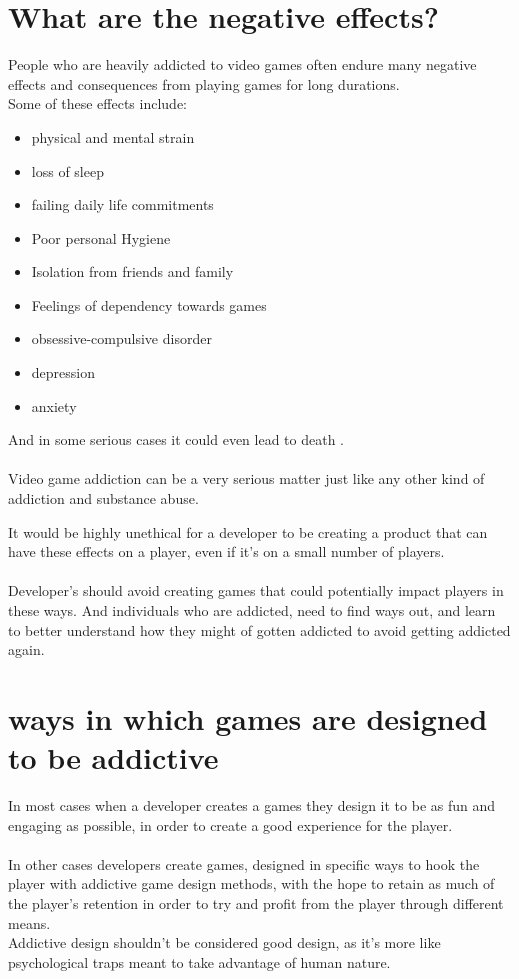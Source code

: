 \documentclass{scrartcl}
\begin{document}
\section{What are the negative effects?}
People who are heavily addicted to video games often endure many negative effects and consequences from playing games for long durations.\cite{Addiction3}
\\
Some of these effects include:
\begin{itemize}
  \item physical and mental strain
  \item loss of sleep
  \item failing daily life commitments
  \item Poor personal Hygiene
  \item Isolation from friends and family
  \item Feelings of dependency towards games
  \item obsessive-compulsive disorder
  \item depression
  \item anxiety
\end{itemize}
And in some serious cases it could even lead to death \cite{parkin2015death}.
\\
\\
Video game addiction can be a very serious matter just like any other kind of addiction and substance abuse.\cite{Addiction1, Addiction2, Addiction3}

It would be highly unethical for a developer to be creating a product that can have these effects on a player, even if it's on a small number of players.
\\
\\
Developer's should avoid creating games that could potentially impact players in these ways.\cite{Ethics1} And individuals who are addicted, need to find ways out, and learn to better understand how they might of gotten addicted to avoid getting addicted again.

\section{ways in which games are designed to be addictive}
In most cases when a developer creates a games they design it to be as fun and engaging as possible, in order to create a good experience for the player.
\\
\\
In other cases developers create games, designed in specific ways to hook the player with addictive game design methods, with the hope to retain as much of the player's retention in order to try and profit from the player through different means.\cite{AddictiveDesign1, AddictiveDesign2}
\\
Addictive design shouldn't be considered good design, as it's more like psychological traps meant to take advantage of human nature.
\end{document}
